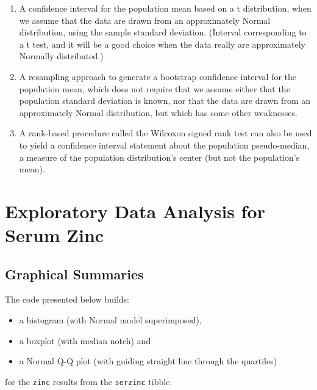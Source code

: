 \documentclass[
]{book}
\providecommand{\tightlist}{%
  \setlength{\itemsep}{0pt}\setlength{\parskip}{0pt}}
\begin{document}
\begin{enumerate}
\def\labelenumi{\arabic{enumi}.}
\tightlist
\item
  A confidence interval for the population mean based on a t distribution, when we assume that the data are drawn from an approximately Normal distribution, using the sample standard deviation. (Interval corresponding to a t test, and it will be a good choice when the data really are approximately Normally distributed.)
\item
  A resampling approach to generate a bootstrap confidence interval for the population mean, which does not require that we assume either that the population standard deviation is known, nor that the data are drawn from an approximately Normal distribution, but which has some other weaknesses.
\item
  A rank-based procedure called the Wilcoxon signed rank test can also be used to yield a confidence interval statement about the population pseudo-median, a measure of the population distribution's center (but not the population's mean).
\end{enumerate}

\hypertarget{exploratory-data-analysis-for-serum-zinc}{%
\section{Exploratory Data Analysis for Serum Zinc}\label{exploratory-data-analysis-for-serum-zinc}}

\hypertarget{graphical-summaries}{%
\subsection{Graphical Summaries}\label{graphical-summaries}}

The code presented below builds:

\begin{itemize}
\tightlist
\item
  a histogram (with Normal model superimposed),
\item
  a boxplot (with median notch) and
\item
  a Normal Q-Q plot (with guiding straight line through the quartiles)
\end{itemize}

for the \texttt{zinc} results from the \texttt{serzinc} tibble.
\end{document}

